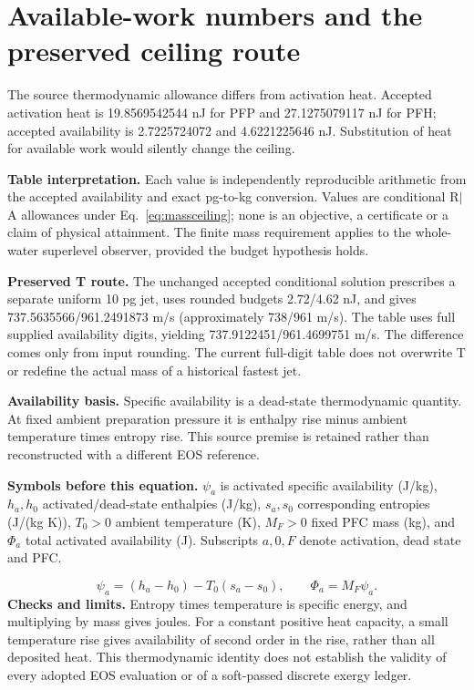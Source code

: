 \documentclass[10pt,a4paper]{article}
\newcommand{\symbols}[1]{\par\textbf{Symbols before this equation.} #1\par}
\newcommand{\nextsection}[1]{\clearpage\section{#1}}
\begin{document}
\nextsection{Available-work numbers and the preserved ceiling route}
The source thermodynamic allowance differs from activation heat. Accepted activation heat is 19.8569542544 nJ for PFP and 27.1275079117 nJ for PFH; accepted availability is 2.7225724072 and 4.6221225646 nJ. Substitution of heat for available work would silently change the ceiling.

\begin{center}

\end{center}
\textbf{Table interpretation.} Each value is independently reproducible arithmetic from the accepted availability and exact pg-to-kg conversion. Values are conditional R$|$A allowances under Eq.~\eqref{eq:massceiling}; none is an objective, a certificate or a claim of physical attainment. The finite mass requirement applies to the whole-water superlevel observer, provided the budget hypothesis holds.

\textbf{Preserved T route.} The unchanged accepted conditional solution prescribes a separate uniform 10 pg jet, uses rounded budgets 2.72/4.62 nJ, and gives 737.5635566/961.2491873 m/s (approximately 738/961 m/s). The table uses full supplied availability digits, yielding 737.9122451/961.4699751 m/s. The difference comes only from input rounding. The current full-digit table does not overwrite T or redefine the actual mass of a historical fastest jet.

\textbf{Availability basis.} Specific availability is a dead-state thermodynamic quantity. At fixed ambient preparation pressure it is enthalpy rise minus ambient temperature times entropy rise. This source premise is retained rather than reconstructed with a different EOS reference.
\symbols{$\psi_a$ is activated specific availability (J/kg), $h_a,h_0$ activated/dead-state enthalpies (J/kg), $s_a,s_0$ corresponding entropies (J/(kg K)), $T_0>0$ ambient temperature (K), $M_F>0$ fixed PFC mass (kg), and $\Phi_a$ total activated availability (J). Subscripts $a,0,F$ denote activation, dead state and PFC.}
\begin{equation}
\psi_a=(h_a-h_0)-T_0(s_a-s_0),\qquad\Phi_a=M_F\psi_a.\label{eq:availability}
\end{equation}
\textbf{Checks and limits.} Entropy times temperature is specific energy, and multiplying by mass gives joules. For a constant positive heat capacity, a small temperature rise gives availability of second order in the rise, rather than all deposited heat. This thermodynamic identity does not establish the validity of every adopted EOS evaluation or of a soft-passed discrete exergy ledger.
\end{document}
